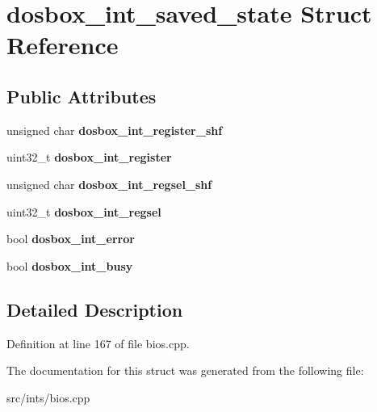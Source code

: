\hypertarget{structdosbox__int__saved__state}{\section{dosbox\-\_\-int\-\_\-saved\-\_\-state Struct Reference}
\label{structdosbox__int__saved__state}
}
\subsection*{Public Attributes}
\begin{DoxyCompactItemize}
\item 
\hypertarget{structdosbox__int__saved__state_a3190dad41dc7ebdb7a5e478c37fba33e}{unsigned char {\bfseries dosbox\-\_\-int\-\_\-register\-\_\-shf}}\label{structdosbox__int__saved__state_a3190dad41dc7ebdb7a5e478c37fba33e}

\item 
\hypertarget{structdosbox__int__saved__state_a4cf4d84310e8ea530f67d12b6dd47aca}{uint32\-\_\-t {\bfseries dosbox\-\_\-int\-\_\-register}}\label{structdosbox__int__saved__state_a4cf4d84310e8ea530f67d12b6dd47aca}

\item 
\hypertarget{structdosbox__int__saved__state_a8baf767617af9ec07f8179944c14d327}{unsigned char {\bfseries dosbox\-\_\-int\-\_\-regsel\-\_\-shf}}\label{structdosbox__int__saved__state_a8baf767617af9ec07f8179944c14d327}

\item 
\hypertarget{structdosbox__int__saved__state_a22e6fa7e3be634cbbc53513c894a9612}{uint32\-\_\-t {\bfseries dosbox\-\_\-int\-\_\-regsel}}\label{structdosbox__int__saved__state_a22e6fa7e3be634cbbc53513c894a9612}

\item 
\hypertarget{structdosbox__int__saved__state_ad5b90f6e340dc6be7d0f6c1cd9c24056}{bool {\bfseries dosbox\-\_\-int\-\_\-error}}\label{structdosbox__int__saved__state_ad5b90f6e340dc6be7d0f6c1cd9c24056}

\item 
\hypertarget{structdosbox__int__saved__state_a61744b295bdc81881e4d05f2bd22f194}{bool {\bfseries dosbox\-\_\-int\-\_\-busy}}\label{structdosbox__int__saved__state_a61744b295bdc81881e4d05f2bd22f194}

\end{DoxyCompactItemize}


\subsection{Detailed Description}


Definition at line 167 of file bios.\-cpp.



The documentation for this struct was generated from the following file\-:\begin{DoxyCompactItemize}
\item 
src/ints/bios.\-cpp\end{DoxyCompactItemize}
